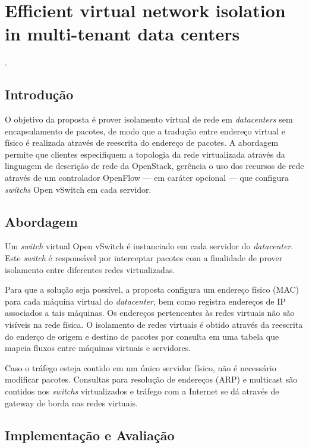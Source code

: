 
\chapter{Efficient virtual network isolation in multi-tenant data centers}
 \cite{moraes2016efficient}.


\section*{Introdução}

O objetivo da proposta é prover isolamento virtual de rede em \textit{datacenters} sem encapsulamento de pacotes, de modo que a tradução entre endereço virtual e físico é realizada através de reescrita do endereço de pacotes.
A abordagem permite que clientes especifiquem a topologia da rede virtualizada através da linguagem de descrição de rede da OpenStack, gerência o uso dos recursos de rede através de um controlador OpenFlow --- em caráter opcional --- que configura \textit{switchs} Open vSwitch em cada servidor.


\section*{Abordagem}

Um \textit{switch} virtual Open vSwitch é instanciado em cada servidor do \textit{datacenter}. Este \textit{switch} é responsável por interceptar pacotes com a finalidade de prover isolamento entre diferentes redes virtualizadas.

Para que a solução seja possível, a proposta configura um endereço físico (MAC) para cada máquina virtual do \textit{datacenter}, bem como registra endereços de IP associados a tais máquinas. Os endereços pertencentes às redes virtuais não são visíveis na rede física.
O isolamento de redes virtuais é obtido através da reescrita do enderço de origem e destino de pacotes por consulta em uma tabela que mapeia fluxos entre máquinas virtuais e servidores.

Caso o tráfego esteja contido em um único servidor físico, não é necessário modificar pacotes. Consultas para resolução de endereços (ARP) e multicast são contidos nos \textit{switchs} virtualizados e tráfego com a Internet se dá através de gateway de borda nas redes virtuais.


\section*{Implementação e Avaliação}

